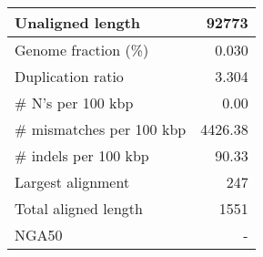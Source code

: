 \documentclass[12pt,a4paper]{article}
\begin{document}
\begin{table}[ht]
\begin{center}
\begin{tabular}{|l*{1}{|r}|}
Unaligned length & 92773 \\ \hline
Genome fraction (\%) & 0.030 \\ \hline
Duplication ratio & 3.304 \\ \hline
\# N's per 100 kbp & 0.00 \\ \hline
\# mismatches per 100 kbp & 4426.38 \\ \hline
\# indels per 100 kbp & 90.33 \\ \hline
Largest alignment & 247 \\ \hline
Total aligned length & 1551 \\ \hline
NGA50 & - \\ \hline
\end{tabular}
\end{center}
\end{table}
\end{document}
